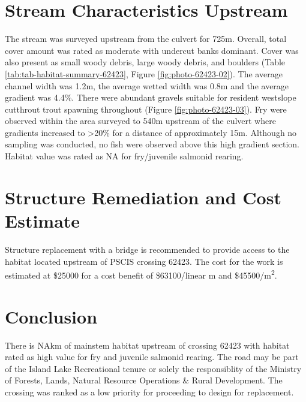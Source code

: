 \documentclass[
]{book}
\begin{document}
\hypertarget{stream-characteristics-upstream-3}{%
\section*{Stream Characteristics Upstream}\label{stream-characteristics-upstream-3}}

The stream was surveyed upstream from the culvert for 725m. Overall, total cover amount was rated as moderate with undercut banks dominant. Cover was also present as small woody debris, large woody debris, and boulders (Table \ref{tab:tab-habitat-summary-62423}, Figure \ref{fig:photo-62423-02}). The average channel width was 1.2m, the average wetted width was 0.8m and the average gradient was 4.4\%. There were abundant gravels suitable for resident westslope cutthrout trout spawning throughout (Figure \ref{fig:photo-62423-03}). Fry were observed within the area surveyed to 540m upstream of the culvert where gradients increased to \textgreater20\% for a distance of approximately 15m. Although no sampling was conducted, no fish were observed above this high gradient section. Habitat value was rated as NA for fry/juvenile salmonid rearing.

\hypertarget{structure-remediation-and-cost-estimate-3}{%
\section*{Structure Remediation and Cost Estimate}\label{structure-remediation-and-cost-estimate-3}}

Structure replacement with a bridge is recommended to provide access to the habitat located upstream of PSCIS crossing 62423. The cost for the work is estimated at \$25000 for a cost benefit of \$63100/linear m and \$45500/m\textsuperscript{2}.

\hypertarget{conclusion-4}{%
\section*{Conclusion}\label{conclusion-4}}

There is NAkm of mainstem habitat upstream of crossing 62423 with habitat rated as high value for fry and juvenile salmonid rearing. The road may be part of the Island Lake Recreational tenure or solely the responsiblity of the Ministry of Forests, Lands, Natural Resource Operations \& Rural Development. The crossing was ranked as a low priority for proceeding to design for replacement.
\end{document}

